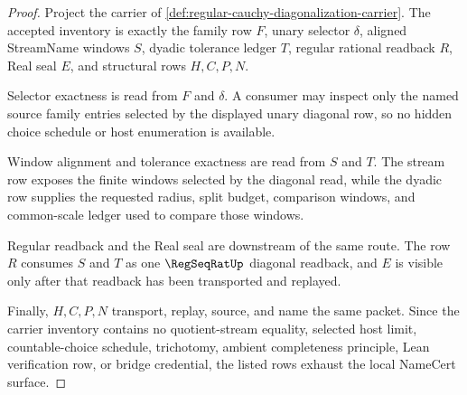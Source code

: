 \begin{proof}
Project the carrier of \autoref{def:regular-cauchy-diagonalization-carrier}. The accepted inventory is exactly the family row $F$, unary selector $\delta$, aligned StreamName windows $S$, dyadic tolerance ledger $T$, regular rational readback $R$, Real seal $E$, and structural rows $H,C,P,N$.

Selector exactness is read from $F$ and $\delta$. A consumer may inspect only the named source family entries selected by the displayed unary diagonal row, so no hidden choice schedule or host enumeration is available.

Window alignment and tolerance exactness are read from $S$ and $T$. The stream row exposes the finite windows selected by the diagonal read, while the dyadic row supplies the requested radius, split budget, comparison windows, and common-scale ledger used to compare those windows.

Regular readback and the Real seal are downstream of the same route. The row $R$ consumes $S$ and $T$ as one $\RegSeqRatUp$ diagonal readback, and $E$ is visible only after that readback has been transported and replayed.

Finally, $H,C,P,N$ transport, replay, source, and name the same packet. Since the carrier inventory contains no quotient-stream equality, selected host limit, countable-choice schedule, trichotomy, ambient completeness principle, Lean verification row, or bridge credential, the listed rows exhaust the local NameCert surface.
\end{proof}

